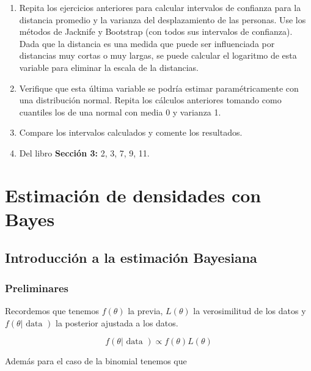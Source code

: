 \documentclass[
  12pt,
]{book}
\theoremstyle{definition}
\theoremstyle{definition}
\theoremstyle{definition}
\theoremstyle{remark}
\begin{document}
\begin{enumerate}
\def\labelenumi{\arabic{enumi}.}
\item
  Repita los ejercicios anteriores para calcular intervalos de confianza para la distancia promedio y la varianza del desplazamiento de las personas. Use los métodos de Jacknife y Bootstrap (con todos sus intervalos de confianza).
  Dada que la distancia es una medida que puede ser influenciada por distancias muy cortas o muy largas, se puede calcular el logaritmo de esta variable para eliminar la escala de la distancias.
\item
  Verifique que esta última variable se podría estimar paramétricamente con una distribución normal.
  Repita los cálculos anteriores tomando como cuantiles los de una normal con media 0 y varianza 1.
\item
  Compare los intervalos calculados y comente los resultados.
\item
  Del libro \autocite{Wasserman2006} \textbf{Sección 3:} 2, 3, 7, 9, 11.
\end{enumerate}

\hypertarget{estimaciuxf3n-de-densidades-con-bayes}{%
\chapter{Estimación de densidades con Bayes}\label{estimaciuxf3n-de-densidades-con-bayes}}

\hypertarget{introducciuxf3n-a-la-estimaciuxf3n-bayesiana}{%
\section{Introducción a la estimación Bayesiana}\label{introducciuxf3n-a-la-estimaciuxf3n-bayesiana}}

\hypertarget{preliminares}{%
\subsection{Preliminares}\label{preliminares}}

Recordemos que tenemos \(f(\theta)\) la previa, \(L(\theta)\) la
verosimilitud de los datos y \(f(\theta|\text { data })\) la posterior
ajustada a los datos.

\begin{equation*}
    f(\theta | \text { data }) \propto f(\theta) L(\theta)
\end{equation*}

Además para el caso de la binomial tenemos que
\end{document}
